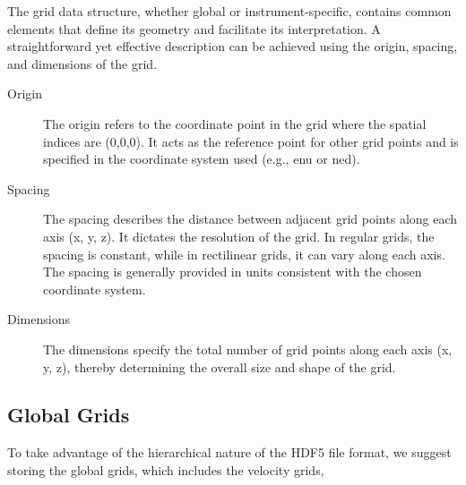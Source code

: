The grid data structure, whether global or instrument-specific, contains common elements that define its geometry and facilitate its interpretation. A straightforward yet effective description can be achieved using the origin, spacing, and dimensions of the grid.

\begin{description}
    \item[Origin] The origin refers to the coordinate point in the grid where the spatial indices are (0,0,0). It acts as the reference point for other grid points and is specified in the coordinate system used (e.g., \gls{enu} or \gls{ned}).
    
    \item[Spacing] The spacing describes the distance between adjacent grid points along each axis (x, y, z). It dictates the resolution of the grid. In regular grids, the spacing is constant, while in rectilinear grids, it can vary along each axis. The spacing is generally provided in units consistent with the chosen coordinate system.
    
    \item[Dimensions] The dimensions specify the total number of grid points along each axis (x, y, z), thereby determining the overall size and shape of the grid.
\end{description}


\subsection{Global Grids}

To take advantage of the hierarchical nature of the HDF5 file format, we suggest storing the global grids, which includes the velocity grids, 

